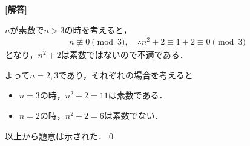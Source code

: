 \documentclass[../../main.tex]{subfiles}
\begin{document}
\begin{oframed}
  
\end{oframed}

{\bf [解答]}

$n$が素数で$n>3$の時を考えると，
\begin{align}
  n\not\equiv0\pmod{3},
  \quad \therefore
  n^2+2 \equiv 1+2 \equiv 0\pmod3
\end{align}
となり，$n^2+2$は素数ではないので不適である．

よって$n=2, 3$であり，それぞれの場合を考えると
\begin{itemize}
  \item $n=3$の時，$n^2+2=11$は素数である．\\
  \item $n=2$の時，$n^2+2=6$は素数でない．
\end{itemize}
以上から題意は示された．\qed

\newpage
\end{document}
